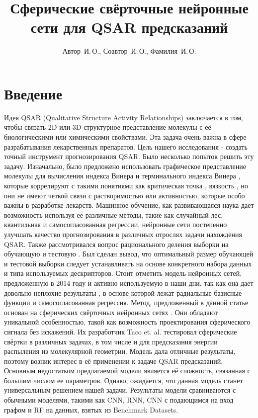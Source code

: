 \documentclass[12pt,twoside]{article}
\title
    [Сферические свёрточные нейронные сети для QSAR предсказаний] %
    {Сферические свёрточные нейронные сети \newline для  QSAR предсказаний}
\author
    [Автор~И.\,О.] %
    {Автор~И.\,О., Соавтор~И.\,О., Фамилия~И.\,О.} %
    [Вареник Н.В., Попова М.С., Стрижов В.В] %
\begin{document}
\maketitle
\section{Введение}
Идея QSAR (Qualitative Structure Activity Relationships) заключается в том, чтобы связать 2D или 3D структурное представление молекулы с её биологическими или химическими свойствами. Эта задача очень важна в сфере разрабатывания лекарственных препаратов. Цель нашего исследования - создать точный инструмент прогнозирования QSAR. Было несколько попыток решить эту задачу. Изначально, было предложено использовать графическое представление молекулы для вычисления индекса Винера и терминального индекса Винера \cite{Wiener15}, которые коррелируют с такими понятиями как критическая точка \cite{Critical}, вязкость \cite{Visc}, но они не имеют четкой связи с растворимостью или активностью, которые особо важны в разработке лекарств. Машинное обучение, как развивающаяся наука дает возможность используя ее различные методы, такие как случайный лес, квантильная и самосогласованная регрессии, нейронные сети постепенно улучшать качество прогнозирования в различных отрослях задачи нахождения QSAR. Также рассмотривался вопрос рационального деления выборки на обучающую и тестовую \cite{journals/jcamd/GolbraikhT02}. Был сделан вывод, что оптимальный размер обучающей и тестовой выборки следует устанавливать на основе конкретного набора данных и типа используемых дескрипторов. Стоит отметить модель нейронных сетей, предложенную в 2014 году и активно используемую в наши дни, так как она дает довольно неплохие результаты \cite{journals/jcisd/ZakharovPSN14a}, в основе которой лежат радиальные базисные функции и самосогласованная регрессия.  
Метод, предложенный в данной статье основан на сферических свёрточных нейронных сетях \cite{SCNN}. Они обладают уникальной особенностью, такой как возможность проектирования сферического сигнала без искажений. Их разработчик Taco et. al. тестировал сферические свёртки в различных задачах, в том числе и для предсказания энергии распыления из молекулярной геометрии. Модель дала отличные результаты, поэтому возник интерес в её применении к задаче QSAR предсказаний. Основным недостатком предлагаемой модели является её сложность, связанная с большим числом ее параметров. Однако, ожидается, что данная модель станет универсальным решением нашей задачи. Результаты модели сравниваются с обычными моделями, такими как CNN, RNN, CNN с подающимся на вход графом и RF на данных, взятых из Benchmark Datasets. 
\end{document}
